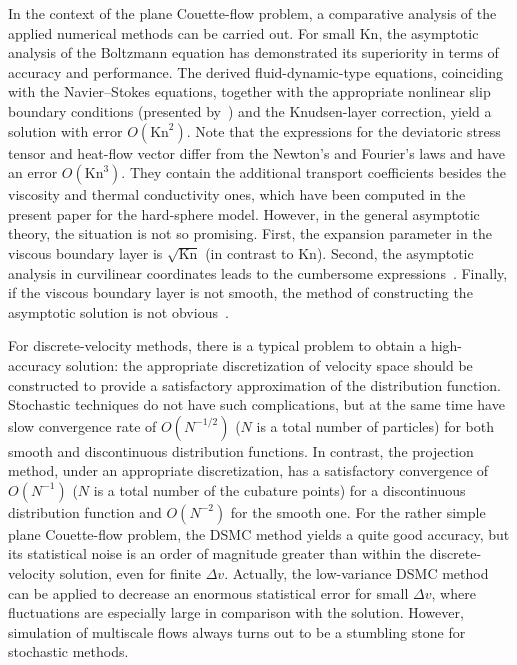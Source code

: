 \documentclass[]{elsarticle} %
\newcommand{\Kn}{\mathrm{Kn}}
\newcommand{\OO}[1]{O(#1)}
\begin{document}
In the context of the plane Couette-flow problem,
a comparative analysis of the applied numerical methods can be carried out.
For small \(\Kn\), the asymptotic analysis of the Boltzmann equation has demonstrated
its superiority in terms of accuracy and performance.
The derived fluid-dynamic-type equations, coinciding with the Navier--Stokes equations,
together with the appropriate nonlinear slip boundary conditions (presented by~\citet{Sone2000})
and the Knudsen-layer correction, yield a solution with error \(\OO{\Kn^2}\).
Note that the expressions for the deviatoric stress tensor and heat-flow vector
differ from the Newton's and Fourier's laws and have an error \(\OO{\Kn^3}\).
They contain the additional transport coefficients besides the viscosity and thermal conductivity ones,
which have been computed in the present paper for the hard-sphere model.
However, in the general asymptotic theory, the situation is not so promising.
First, the expansion parameter in the viscous boundary layer is \(\sqrt{\Kn}\) (in contrast to \(\Kn\)).
Second, the asymptotic analysis in curvilinear coordinates leads to the cumbersome expressions~\citep{Sone2002}.
Finally, if the viscous boundary layer is not smooth,
the method of constructing the asymptotic solution is not obvious~\citep{Aoki2014}.

For discrete-velocity methods, there is a typical problem to obtain a high-accuracy solution:
the appropriate discretization of velocity space should be constructed
to provide a satisfactory approximation of the distribution function.
Stochastic techniques do not have such complications,
but at the same time have slow convergence rate of \(\OO{N^{-1/2}}\)
(\(N\) is a total number of particles)
for both smooth and discontinuous distribution functions.
In contrast, the projection method, under an appropriate discretization,
has a satisfactory convergence of \(\OO{N^{-1}}\)
(\(N\) is a total number of the cubature points)
for a discontinuous distribution function and \(\OO{N^{-2}}\) for the smooth one.
For the rather simple plane Couette-flow problem,
the DSMC method yields a quite good accuracy, but its statistical noise
is an order of magnitude greater than within the discrete-velocity solution, even for finite \(\Delta{v}\).
Actually, the low-variance DSMC method~\citep{Hadji2011}
can be applied to decrease an enormous statistical error for small \(\Delta{v}\),
where fluctuations are especially large in comparison with the solution.
However, simulation of multiscale flows always turns out to be a stumbling stone for stochastic methods.
\end{document}

